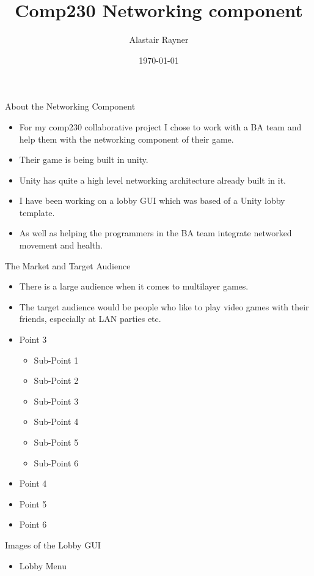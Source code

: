 \documentclass{beamer}
\title{Comp230 Networking component}
\author{Alastair Rayner}
\date{\today}
\begin{document}
\maketitle

\begin{frame}{About the Networking Component}
	\begin{itemize}
		\item For my comp230 collaborative project I chose to work with a BA team and help them with the networking component of their game.\pause
		\item Their game is being built in unity. \pause
		\item Unity has quite a high level networking architecture already built in it.  \pause
		\item I have been working on a lobby GUI which was based of a Unity lobby template. \pause
		\item As well as helping the programmers in the BA team integrate networked movement and health.
	\end{itemize}
\end{frame}

\begin{frame}{The Market and Target Audience}
	\begin{itemize}
		\item There is a large audience when it comes to multilayer games. \pause
		\item The target audience would be people who like to play video games with their friends, especially at LAN parties etc. \pause
		\item Point 3 \pause
			\begin{itemize}
				\item Sub-Point 1 
				\item Sub-Point 2 \pause
				\item Sub-Point 3 
				\item Sub-Point 4 \pause
				\item Sub-Point 5 
				\item Sub-Point 6 \pause
			\end{itemize}
		\item Point 4 \pause
		\item Point 5 \pause
		\item Point 6
	\end{itemize}
\end{frame}

\begin{frame}{Images of the Lobby GUI}
	\begin{itemize}
		\item Lobby Menu \pause

	\end{itemize}
\end{frame}
\end{document}
